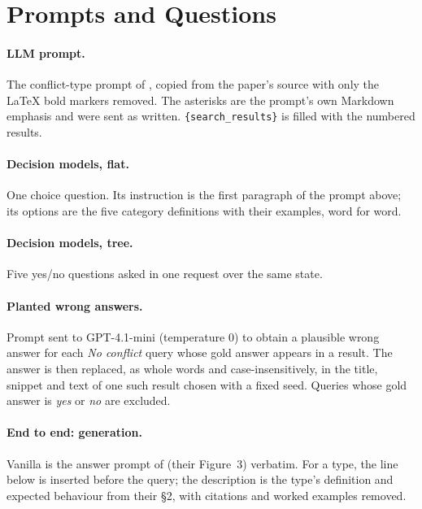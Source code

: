 \section{Prompts and Questions}
\label{app:prompts}

\paragraph{LLM prompt.} The conflict-type prompt of \citet{cattan2025dragged}, copied from the paper's source with
only the \LaTeX{} bold markers removed. The asterisks are the prompt's own Markdown emphasis and were sent
as written. \texttt{\{search\_results\}} is filled with the numbered results.



\paragraph{Decision models, flat.} One choice question. Its instruction is the first paragraph of the prompt above; its options
are the five category definitions with their examples, word for word.



\paragraph{Decision models, tree.} Five yes/no questions asked in one request over the same state.



\paragraph{Planted wrong answers.} Prompt sent to GPT-4.1-mini (temperature 0) to obtain a plausible wrong answer
for each \emph{No conflict} query whose gold answer appears in a result. The answer is then replaced, as whole words
and case-insensitively, in the title, snippet and text of one such result chosen with a fixed seed. Queries whose
gold answer is \emph{yes} or \emph{no} are excluded.



\paragraph{End to end: generation.} Vanilla is the answer prompt of \citet{cattan2025dragged} (their Figure~3)
verbatim. For a type, the line below is inserted before the query; the description is the type's definition and
expected behaviour from their \S2, with citations and worked examples removed.

